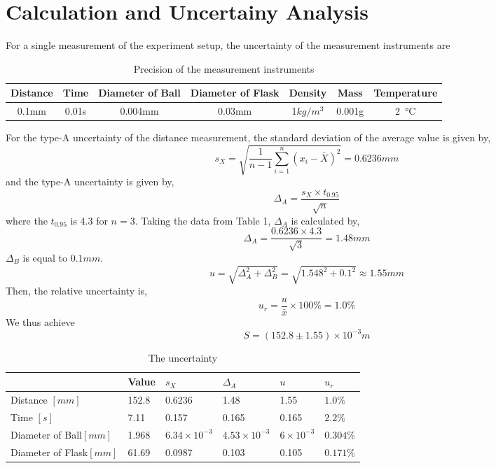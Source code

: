 \documentclass[12pt]{article}
\begin{document}
    \section{Calculation and Uncertainy Analysis}
        For a single measurement of the experiment setup, the uncertainty of the measurement instruments are
        \begin{table}[h]
        \centering
        \begin{tabularx}{\textwidth}{|c|c|c|c|c|c|c|}
            \hline
            Distance  & Time & Diameter of Ball& Diameter of Flask &Density & Mass & Temperature\\
            \hline
           0.1mm & 0.01s & 0.004mm &0.03mm &1$kg/m^3$ &0.001g &\SI{2}{\degreeCelsius} \\
            \hline
        \end{tabularx}
        \caption{Precision of the measurement instruments}
        \end{table}
    For the type-A uncertainty of the distance measurement, the standard  deviation of the average value is given by,
    $$s_X = \sqrt{\frac{1}{n-1}\sum_{i=1}^{n}(x_i - \bar{X})^2 }=0.6236mm$$
    and the type-A uncertainty is given by,
    $$\Delta_A = \frac{s_X\times t_{0.95}}{\sqrt{n}}$$
    where the $t_0.95$ is 4.3 for $n = 3$. Taking the data from Table 1, 
    $\Delta_A$ is calculated by,
    $$\Delta_A = \frac{0.6236\times4.3}{\sqrt{3}}=1.48mm$$ 
    $\Delta_B$ is equal to $0.1mm$.
    $$u = \sqrt{\Delta_A^2+\Delta_B^2}=\sqrt{1.548^2+0.1^2}\approx1.55mm$$
    Then, the relative uncertainty is,
    $$u_{r} = \frac{u}{\bar{x}}\times100\%=1.0\%$$
    We thus achieve $$S = (152.8 \pm 1.55)\times10^{-3}m$$
    \begin{table}[h]
    \centering
    \begin{tabularx}{\textwidth}{|p{5cm}|X|p{2cm}|p{2cm}|p{1.8cm}|X|}
        \hline
         &Value &$s_X$ & $\Delta_{A}$ & $u$ & $u_r$\\
        \hline
        Distance $[mm]$ &152.8 & 0.6236 &1.48 &1.55 &$1.0\%$\\
        Time $[s]$&7.11 &0.157 &0.165 &0.165 &$2.2\%$\\
        Diameter of Ball$[mm]$ &1.968 &$6.34\times10^{-3}$ &$4.53\times10^{-3}$ &$6\times10^{-3}$ &$0.304\%$\\
        Diameter of Flask$[mm]$&61.69 &0.0987 &0.103 &0.105 &$0.171\%$\\
        \hline
    \end{tabularx}
    \caption{The uncertainty}
    \end{table}
\end{document}
